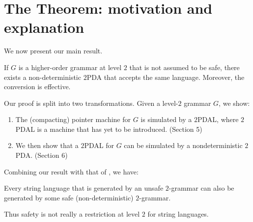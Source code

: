 \section{The Theorem: motivation and explanation}

We now present our main result.

\begin{theorem} If $G$ is a higher-order grammar at level $2$ that is
not assumed to be safe, there exists a non-deterministic $2$PDA
that accepts the same language. Moreover, the conversion is effective.
\end{theorem}

Our proof is split into two transformations. Given a level-$2$ grammar
$G$, we show:
\begin{enumerate} \item The (compacting) pointer machine for $G$ is simulated by a
$2$PDAL, where $2$PDAL is a machine that has yet to be
introduced. (Section 5)
\item We then show that a $2$PDAL for $G$ can be simulated by a
nondeterministic $2$PDA. (Section 6)
\end{enumerate}

Combining our result with that of \cite{DG86}, we have:

\begin{corollary}
Every string language that is generated by an unsafe $2$-grammar can
also be generated by some safe (non-deterministic) $2$-grammar.
\end{corollary}

Thus safety is not really a restriction at level $2$ for string languages.
